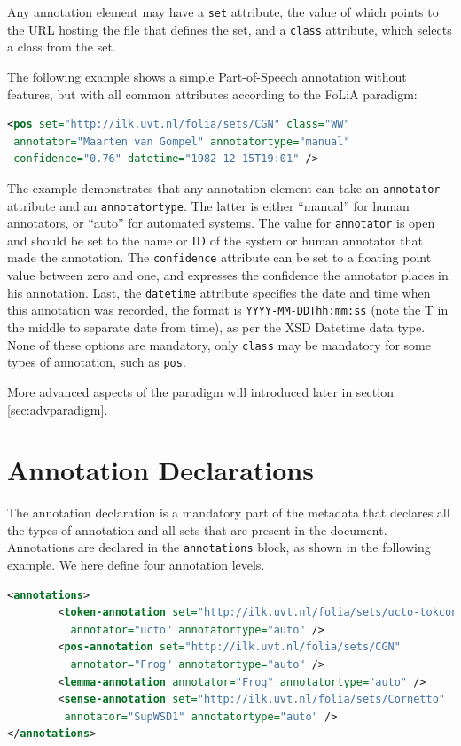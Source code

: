 \documentclass[a4paper,12pt]{report}
\begin{document}
Any annotation element may have a \texttt{set} attribute, the value of which points to the URL hosting the file that defines the set, and a \texttt{class} attribute, which selects a class from the set.

The following example shows a simple Part-of-Speech annotation without features, but with all common attributes according to the FoLiA paradigm:

\begin{lstlisting}[language=xml]
<pos set="http://ilk.uvt.nl/folia/sets/CGN" class="WW" 
 annotator="Maarten van Gompel" annotatortype="manual"
 confidence="0.76" datetime="1982-12-15T19:01" />
\end{lstlisting}

The example demonstrates that any annotation element can take an \texttt{annotator} attribute and an \texttt{annotatortype}. The latter is either ``manual'' for human annotators, or ``auto'' for automated systems.  The value for \texttt{annotator} is open and should be set to the name or ID of the system or human annotator that made the annotation. The \texttt{confidence} attribute can be set to a floating point value between zero and one, and expresses the confidence the annotator places in his annotation. Last, the \texttt{datetime} attribute specifies the date and time when this annotation was recorded, the format is \texttt{YYYY-MM-DDThh:mm:ss} (note the T in the middle to separate date from time), as per the XSD Datetime data type. None of these options are mandatory, only \texttt{class} may be mandatory for some types of annotation, such as \texttt{pos}.

More advanced aspects of the paradigm will introduced later in section \ref{sec:advparadigm}.

\section{Annotation Declarations}


The annotation declaration is a mandatory part of the metadata that declares all the types of annotation and all sets that are present in the document. Annotations are declared in the \texttt{annotations} block, as shown in the following example. We here define four annotation levels.

\begin{lstlisting}[language=xml]
<annotations>
        <token-annotation set="http://ilk.uvt.nl/folia/sets/ucto-tokconfig-nl" 
          annotator="ucto" annotatortype="auto" />
        <pos-annotation set="http://ilk.uvt.nl/folia/sets/CGN" 
          annotator="Frog" annotatortype="auto" />
        <lemma-annotation annotator="Frog" annotatortype="auto" />    
        <sense-annotation set="http://ilk.uvt.nl/folia/sets/Cornetto"
         annotator="SupWSD1" annotatortype="auto" />    
</annotations>
\end{lstlisting}
\end{document}
